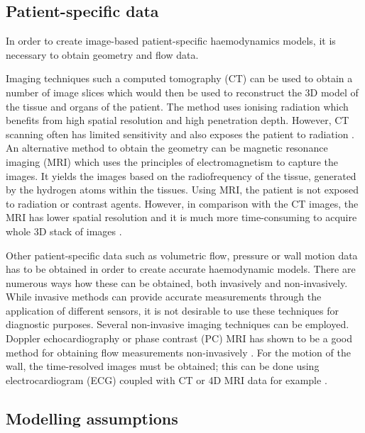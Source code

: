 \subsection{Patient-specific data}
In order to create image-based patient-specific haemodynamics models, it is necessary to obtain geometry and flow data. \par

Imaging techniques such a computed tomography (CT) can be used to obtain a number of image slices which would then be used to reconstruct the 3D model of the tissue and organs of the patient. The method  uses ionising radiation which benefits from high spatial resolution and high penetration depth. However, CT scanning often has limited sensitivity and also exposes the patient to radiation \cite{Saremi2015CoronaryCT}. An alternative method to obtain the geometry can be magnetic resonance imaging (MRI) which uses the principles of electromagnetism to capture the images. It yields the images based on the radiofrequency of the tissue, generated by the hydrogen atoms within the tissues. Using MRI, the patient is not exposed to radiation or contrast agents. However, in comparison with the CT images, the MRI has lower spatial resolution and it is much more time-consuming to acquire whole 3D stack of images \cite{Maurovich-Horvat2012DifferentiationHearts, Karmonik2008ComputationalRates}.\par

Other patient-specific data such as volumetric flow, pressure  or wall motion data has to be obtained in order to create accurate haemodynamic models. There are numerous ways how these can be obtained, both invasively and non-invasively. While invasive methods can provide accurate measurements through the application of different sensors, it is not desirable to use these techniques for diagnostic purposes. Several non-invasive imaging techniques can be employed. Doppler echocardiography or phase contrast (PC) MRI has shown to be a good method for obtaining flow measurements non-invasively \cite{Whitlock2015NoninvasiveAorta}. For the motion of the wall, the time-resolved images must be obtained; this can be done using electrocardiogram (ECG) coupled with CT or 4D MRI data for example \cite{Bonfanti2017ComputationalData,Alimohammadi2015AorticUnderstanding}.

\subsection{Modelling assumptions}

